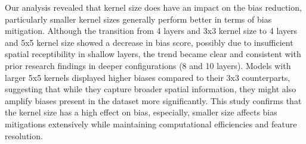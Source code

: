 \documentclass[conference]{IEEEtran}
\begin{document}
Our analysis revealed that kernel size does have an impact on the bias reduction, particularly smaller kernel sizes generally perform better in terms of bias mitigation. Although the transition from 4 layers and 3x3 kernel size to 4 layers and 5x5 kernel size showed a decrease in bias score, possibly due to insufficient spatial receptibility in shallow layers, the trend became clear and consistent with prior research findings in deeper configurations (8 and 10 layers)\cite{simonyan2014very}. Models with larger 5x5 kernels displayed higher biases compared to their 3x3 counterparts, suggesting that while they capture broader spatial information, they might also amplify biases present in the dataset more significantly.
This study confirms that the kernel size has a high effect on bias, especially, smaller size affects bias mitigations extensively while maintaining computational efficiencies and feature resolution.
\end{document}
